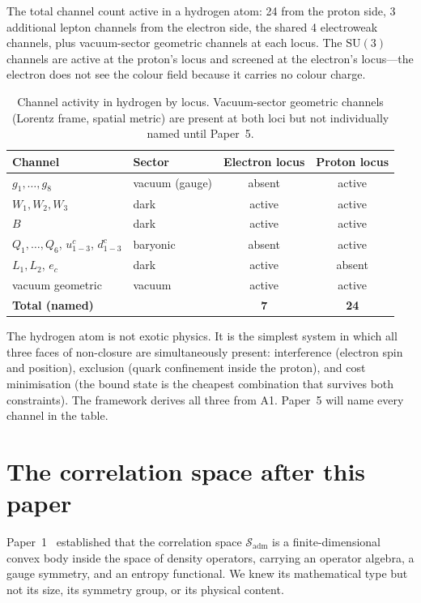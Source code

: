 \documentclass[11pt]{article}
\newcommand{\SU}{\mathrm{SU}}
\begin{document}
The total channel count active in a hydrogen atom: 24 from the proton
side, 3 additional lepton channels from the electron side, the shared 4
electroweak channels, plus vacuum-sector geometric channels at each
locus.  The $\SU(3)$ channels are active at the proton's locus and
screened at the electron's locus---the electron does not see the colour
field because it carries no colour charge.

\begin{table}[h]
\centering\small
\begin{tabular}{llcc}
\toprule
\textbf{Channel} & \textbf{Sector} & \textbf{Electron locus} & \textbf{Proton locus} \\
\midrule
$g_1,\ldots,g_8$ & vacuum (gauge) & absent & active \\
$W_1, W_2, W_3$ & dark & active & active \\
$B$              & dark & active & active \\
$Q_1,\ldots,Q_6$, $u^c_{1-3}$, $d^c_{1-3}$ & baryonic & absent & active \\
$L_1, L_2$, $e_c$ & dark & active & absent \\
vacuum geometric & vacuum & active & active \\
\midrule
\textbf{Total (named)} & & \textbf{7} & \textbf{24} \\
\bottomrule
\end{tabular}
\caption{Channel activity in hydrogen by locus.  Vacuum-sector geometric
channels (Lorentz frame, spatial metric) are present at both loci but not
individually named until Paper~5.}
\end{table}

The hydrogen atom is not exotic physics.  It is the simplest system in
which all three faces of non-closure are simultaneously present:
interference (electron spin and position), exclusion (quark confinement
inside the proton), and cost minimisation (the bound state is the cheapest
combination that survives both constraints).  The framework derives all
three from A1.  Paper~5 will name every channel in the table.


\section{The correlation space after this paper}
\label{sec:corr_space}

Paper~1~\cite{BrookePaper1} established that the correlation space $\mathcal{S}_{\mathrm{adm}}$ is a finite-dimensional convex body inside the space of density operators, carrying an operator algebra, a gauge symmetry, and an entropy functional.  We knew its mathematical type but not its size, its symmetry group, or its physical content.
\end{document}
